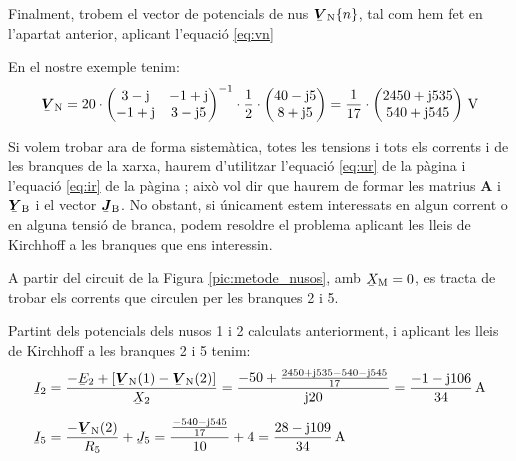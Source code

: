 Finalment,
trobem el vector de potencials de nus $\mcmplx{V}\ped{N}\{n\}$, tal
com  hem fet en l'apartat anterior, aplicant l'equaci\'{o} \eqref{eq:vn}

En el nostre exemple tenim:
\[
   \mcmplx{V}\ped{N} =
   20 \cdot \begin{pmatrix}
         3 - \ju  & -1 + \ju \\ -1 + \ju & 3 - \ju 5
   \end{pmatrix} ^{-1} \cdot
   \frac{1}{2} \cdot \begin{pmatrix}
         40 - \ju 5 \\
         8 + \ju 5
   \end{pmatrix} =
   \frac{1}{17} \cdot \begin{pmatrix}
         2450 + \ju 535 \\ 540  + \ju 545
   \end{pmatrix}\unit{V}
\]

Si volem trobar ara de forma sistem\`{a}tica, totes les tensions i tots
els corrents i  de les branques de la xarxa, haurem d'utilitzar
l'equaci\'{o} \eqref{eq:ur} de la p\`{a}gina \pageref{eq:ur} i l'equaci\'{o}
\eqref{eq:ir} de la p\`{a}gina \pageref{eq:ir}; aix\`{o} vol dir que haurem
de formar les matrius $\boldsymbol{A}$ i $\mcmplx{Y}\ped{B}$ i el
vector $\mcmplx{J}\ped{B}$. No obstant, si \'{u}nicament estem
interessats en algun corrent o en alguna tensi\'{o} de branca, podem
resoldre el problema aplicant les lleis de Kirchhoff a les branques
que ens interessin.

\begin{exemple}
A partir del circuit de la Figura \vref{pic:metode_nusos}, amb
$\cmplx{X}\ped{M}=0$, es tracta de trobar els corrents que circulen
per les branques 2 i 5.

Partint dels potencials dels nusos 1 i 2 calculats anteriorment, i
aplicant les lleis de Kirchhoff a les branques 2 i 5 tenim:
\begin{align*}
   \cmplx{I}_2 &= \frac{-\cmplx{E}_2 + [\mcmplx{V}\ped{N}(1) - \mcmplx{V}\ped{N}(2)]}
                  {\cmplx{X}_2} = \frac{-50 + \frac{2450+\ju 535 -540
                  - \ju 545}{17}} {\ju 20} = \frac{-1 - \ju 106}{34}\unit{A} \\[1.5ex]
   \cmplx{I}_5 &=  \frac{- \mcmplx{V}\ped{N}(2)}{R_5}  + \cmplx{J}_5 =
                  \frac{\frac{-540 - \ju 545}{17}}{10} + 4 =
                  \frac{28 - \ju 109}{34}\unit{A}
\end{align*}

\end{exemple}

